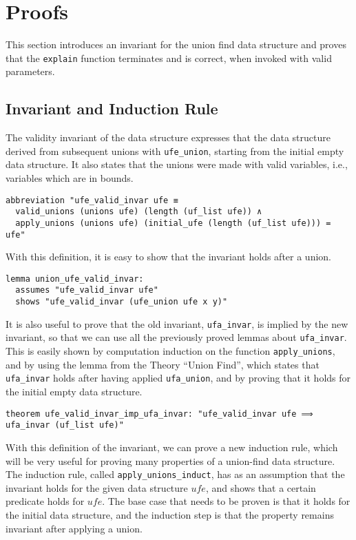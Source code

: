 \section{Proofs}

This section introduces an invariant for the union find data structure and proves that the \lstinline{explain} function terminates and is correct, when invoked with valid parameters.

\subsection{Invariant and Induction Rule}

The validity invariant of the data structure expresses that the data structure derived from subsequent unions with \lstinline{ufe_union}, starting from the initial empty data structure.
It also states that the unions were made with valid variables, i.e., variables which are in bounds.

\begin{lstlisting}
abbreviation "ufe_valid_invar ufe ≡
  valid_unions (unions ufe) (length (uf_list ufe)) ∧
  apply_unions (unions ufe) (initial_ufe (length (uf_list ufe))) = ufe"
\end{lstlisting}

With this definition, it is easy to show that the invariant holds after a union.

\begin{lstlisting}
lemma union_ufe_valid_invar:
  assumes "ufe_valid_invar ufe"
  shows "ufe_valid_invar (ufe_union ufe x y)"
\end{lstlisting}

It is also useful to prove that the old invariant, \lstinline{ufa_invar}, is implied by the new invariant, so that we can use all the previously proved lemmas about \lstinline{ufa_invar}. This is easily shown by computation induction on the function \lstinline{apply_unions}, and by using the lemma from the Theory ``Union Find'', which states that \lstinline{ufa_invar} holds after having applied \lstinline{ufa_union}, and by proving that it holds for the initial empty data structure.

\begin{lstlisting}
theorem ufe_valid_invar_imp_ufa_invar: "ufe_valid_invar ufe ⟹ ufa_invar (uf_list ufe)"
\end{lstlisting}

With this definition of the invariant, we can prove a new induction rule, which will be very useful for proving many properties of a union-find data structure. The induction rule, called \lstinline{apply_unions_induct}, has as an assumption that the invariant holds for the given data structure $ufe$, and shows that a certain predicate holds for $ufe$. The base case that needs to be proven is that it holds for the initial data structure, and the induction step is that the property remains invariant after applying a union.

